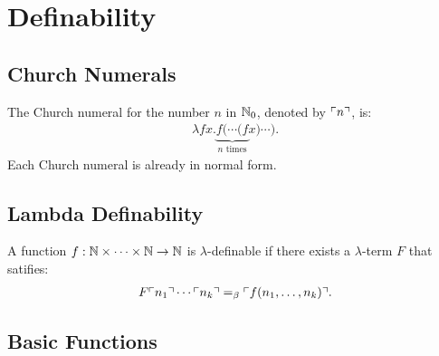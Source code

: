 \section{Definability}

\subsection{Church Numerals}

The Church numeral for the number $n$ in $\mathbb{N}_0$, denoted by 
$\ulcorner n \urcorner$, is: \begin{align*}
    \lambda fx. \underbrace{f(\cdots (f}_{n \text{ times}}  x) \cdots).
\end{align*} Each Church numeral is already in normal form.

\subsection{Lambda Definability}

A function $f : \mathbb{N} \times \cdots \times \mathbb{N} \to \mathbb{N}$
is $\lambda$-definable if there exists a $\lambda$-term $F$ that
satifies: \begin{align*}
    F \ulcorner n_1 \urcorner \cdots \ulcorner n_k \urcorner =_\beta \ulcorner f(n_1, \ldots, n_k) \urcorner.
\end{align*}

\subsection{Basic Functions}

